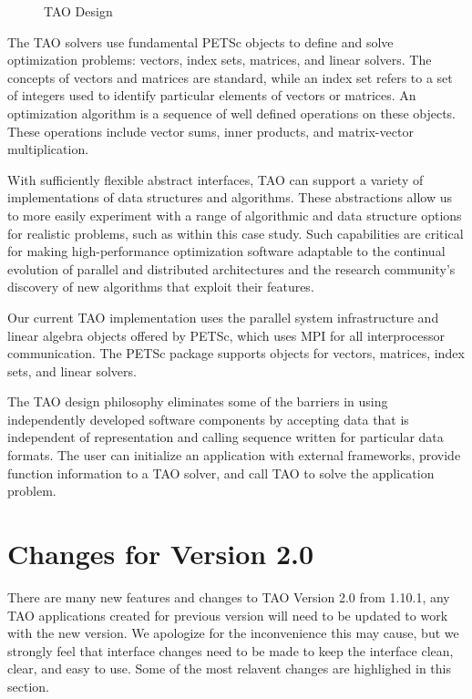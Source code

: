 
\begin{figure}
\centerline{\epsfysize=3.5in }
\caption{TAO Design}
\label{tao:design}
\end{figure}


The TAO solvers use fundamental PETSc objects to define and solve
optimization problems: vectors, index sets, matrices, and linear
solvers.  The concepts of vectors and matrices are standard, while an
index set refers to a set of integers used to identify particular
elements of vectors or matrices.  An optimization algorithm is a
sequence of well defined operations on these objects.  These
operations include vector sums, inner products, and matrix-vector
multiplication.

With sufficiently flexible abstract interfaces, TAO can support a
variety of implementations of data structures and algorithms.  These
abstractions allow us to more easily experiment with a range of
algorithmic and data structure options for realistic problems, such as
within this case study.  Such capabilities are critical for making
high-performance optimization software adaptable to the continual
evolution of parallel and distributed architectures and the research
community's discovery of new algorithms that exploit their features.

Our current TAO implementation uses the parallel system
infrastructure and linear algebra objects offered by PETSc,
which uses MPI \cite{using-mpi} for all interprocessor communication.
The PETSc package supports objects for vectors, matrices, index 
sets, and linear solvers.

The TAO design philosophy eliminates some of the barriers in using
independently developed software components by accepting data that is
independent of representation and calling sequence written for
particular data formats.  The user can initialize an application with
external frameworks, provide function information to a TAO solver, and
call TAO to solve the application problem.

\section{Changes for Version 2.0}
There are many new features and changes to TAO Version 2.0 from 1.10.1, 
any TAO applications created for previous version will need to be updated
to work with the new version.  We apologize for the inconvenience this 
may cause, but we strongly feel that interface changes need to be made
to keep the interface clean, clear, and easy to use. Some of the most
relavent changes are highlighed in this section.

